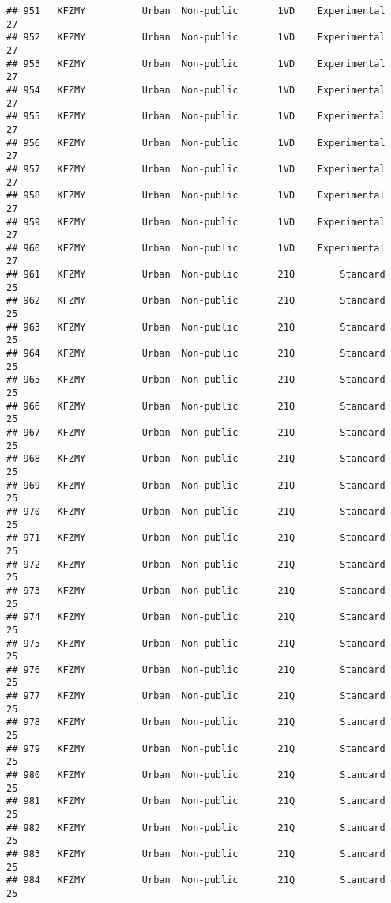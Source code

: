 \documentclass[
]{article}
\begin{document}
\begin{verbatim}
## 951   KFZMY          Urban  Non-public       1VD    Experimental        27
## 952   KFZMY          Urban  Non-public       1VD    Experimental        27
## 953   KFZMY          Urban  Non-public       1VD    Experimental        27
## 954   KFZMY          Urban  Non-public       1VD    Experimental        27
## 955   KFZMY          Urban  Non-public       1VD    Experimental        27
## 956   KFZMY          Urban  Non-public       1VD    Experimental        27
## 957   KFZMY          Urban  Non-public       1VD    Experimental        27
## 958   KFZMY          Urban  Non-public       1VD    Experimental        27
## 959   KFZMY          Urban  Non-public       1VD    Experimental        27
## 960   KFZMY          Urban  Non-public       1VD    Experimental        27
## 961   KFZMY          Urban  Non-public       21Q        Standard        25
## 962   KFZMY          Urban  Non-public       21Q        Standard        25
## 963   KFZMY          Urban  Non-public       21Q        Standard        25
## 964   KFZMY          Urban  Non-public       21Q        Standard        25
## 965   KFZMY          Urban  Non-public       21Q        Standard        25
## 966   KFZMY          Urban  Non-public       21Q        Standard        25
## 967   KFZMY          Urban  Non-public       21Q        Standard        25
## 968   KFZMY          Urban  Non-public       21Q        Standard        25
## 969   KFZMY          Urban  Non-public       21Q        Standard        25
## 970   KFZMY          Urban  Non-public       21Q        Standard        25
## 971   KFZMY          Urban  Non-public       21Q        Standard        25
## 972   KFZMY          Urban  Non-public       21Q        Standard        25
## 973   KFZMY          Urban  Non-public       21Q        Standard        25
## 974   KFZMY          Urban  Non-public       21Q        Standard        25
## 975   KFZMY          Urban  Non-public       21Q        Standard        25
## 976   KFZMY          Urban  Non-public       21Q        Standard        25
## 977   KFZMY          Urban  Non-public       21Q        Standard        25
## 978   KFZMY          Urban  Non-public       21Q        Standard        25
## 979   KFZMY          Urban  Non-public       21Q        Standard        25
## 980   KFZMY          Urban  Non-public       21Q        Standard        25
## 981   KFZMY          Urban  Non-public       21Q        Standard        25
## 982   KFZMY          Urban  Non-public       21Q        Standard        25
## 983   KFZMY          Urban  Non-public       21Q        Standard        25
## 984   KFZMY          Urban  Non-public       21Q        Standard        25

\end{verbatim}
\end{document}
